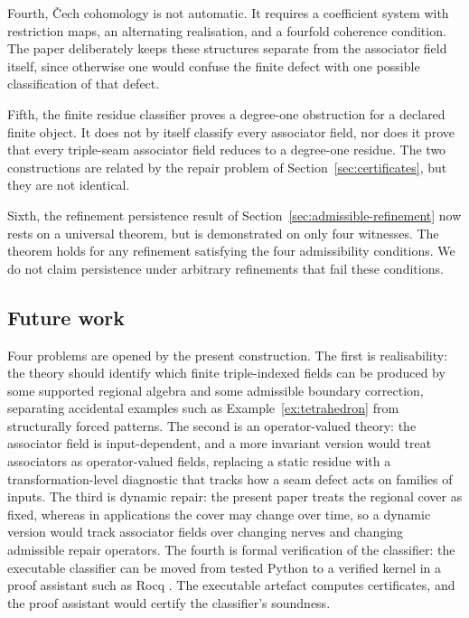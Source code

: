 \documentclass[11pt]{article}
\begin{document}
Fourth, \v{C}ech cohomology is not automatic. It requires a coefficient system with restriction maps, an alternating realisation, and a fourfold coherence condition. The paper deliberately keeps these structures separate from the associator field itself, since otherwise one would confuse the finite defect with one possible classification of that defect.

Fifth, the finite residue classifier proves a degree-one obstruction for a declared finite object. It does not by itself classify every associator field, nor does it prove that every triple-seam associator field reduces to a degree-one residue. The two constructions are related by the repair problem of Section~\ref{sec:certificates}, but they are not identical.

Sixth, the refinement persistence result of Section~\ref{sec:admissible-refinement} now rests on a universal theorem, but is demonstrated on only four witnesses. The theorem holds for any refinement satisfying the four admissibility conditions. We do not claim persistence under arbitrary refinements that fail these conditions.

\subsection{Future work}

Four problems are opened by the present construction. The first is realisability: the theory should identify which finite triple-indexed fields can be produced by some supported regional algebra and some admissible boundary correction, separating accidental examples such as Example~\ref{ex:tetrahedron} from structurally forced patterns. The second is an operator-valued theory: the associator field is input-dependent, and a more invariant version would treat associators as operator-valued fields, replacing a static residue with a transformation-level diagnostic that tracks how a seam defect acts on families of inputs. The third is dynamic repair: the present paper treats the regional cover as fixed, whereas in applications the cover may change over time, so a dynamic version would track associator fields over changing nerves and changing admissible repair operators. The fourth is formal verification of the classifier: the executable classifier can be moved from tested Python to a verified kernel in a proof assistant such as Rocq \cite{Rocq2025}. The executable artefact computes certificates, and the proof assistant would certify the classifier's soundness.
\end{document}
